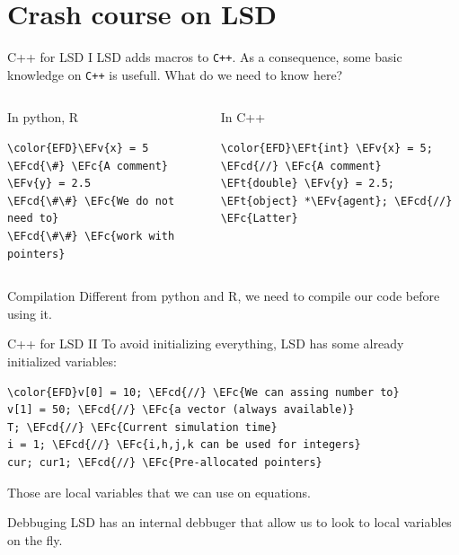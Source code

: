 \documentclass[bigger,aspectratio=169]{beamer}
\newcommand{\EFc}[1]{\textcolor{EFc}{#1}} %
\newcommand{\EFcd}[1]{\textcolor{EFcd}{#1}} %
\newcommand{\EFv}[1]{\textcolor{EFv}{#1}} %
\newcommand{\EFt}[1]{\textcolor{EFt}{#1}} %
\begin{document}
\section{Crash course on LSD}
\label{sec:org3fb6557}

\begin{frame}[label={sec:org0dbdc35},fragile]{C++ for LSD I}
 LSD adds macros to \texttt{C++}.
As a consequence, some basic knowledge on \texttt{C++} is usefull.
What do we need to know here?
\begin{columns}
\begin{column}{0.4\columnwidth}
\begin{block}{In python, R}
\begin{Code}
\begin{Verbatim}
\color{EFD}\EFv{x} = 5 \EFcd{\#} \EFc{A comment}
\EFv{y} = 2.5
\EFcd{\#\#} \EFc{We do not need to}
\EFcd{\#\#} \EFc{work with pointers}
\end{Verbatim}
\end{Code}
\end{block}
\end{column}
\begin{column}{0.4\columnwidth}
\begin{block}{In C++}
\begin{Code}
\begin{Verbatim}
\color{EFD}\EFt{int} \EFv{x} = 5; \EFcd{//} \EFc{A comment}
\EFt{double} \EFv{y} = 2.5;
\EFt{object} *\EFv{agent}; \EFcd{//} \EFc{Latter}
\end{Verbatim}
\end{Code}
\end{block}
\end{column}
\end{columns}
\begin{block}{Compilation}
Different from python and R, we need to \alert{compile} our code before using it.
\end{block}
\end{frame}
\begin{frame}[label={sec:orgaae6dfa},fragile]{C++ for LSD II}
 To avoid initializing everything, LSD has some already initialized variables:

\begin{Code}
\begin{Verbatim}
\color{EFD}v[0] = 10; \EFcd{//} \EFc{We can assing number to}
v[1] = 50; \EFcd{//} \EFc{a vector (always available)}
T; \EFcd{//} \EFc{Current simulation time}
i = 1; \EFcd{//} \EFc{i,h,j,k can be used for integers}
cur; cur1; \EFcd{//} \EFc{Pre-allocated pointers}
\end{Verbatim}
\end{Code}

Those are \alert{local variables} that we can use on equations.
\begin{block}{Debbuging}
LSD has an internal debbuger that allow us to look to local variables on the fly.
\end{block}
\end{frame}
\end{document}
